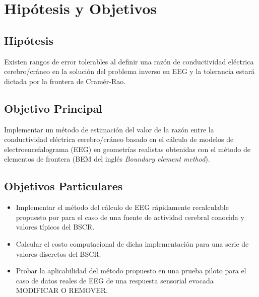 %
\chapter{Hipótesis y Objetivos}
\label{sec:obj}

\section{Hipótesis}
\label{sec:obj:hipotesis}

Existen rangos de error tolerables al definir una razón de conductividad eléctrica cerebro/cráneo en la solución del problema inverso en EEG y la tolerancia estará dictada por la frontera de Cramér-Rao.

\section{Objetivo Principal}
\label{sec:obj:main}

Implementar un método de estimación del valor de la razón entre la conductividad eléctrica cerebro/cráneo basado en el cálculo de modelos de electroencefalograma (EEG) en geometrías realistas obtenidas con el método de elementos de frontera (BEM del inglés \emph{Boundary element method}).

\section{Objetivos Particulares}
\label{sec:obj:individual}

\begin{itemize}
	\item Implementar el método del cálculo de EEG rápidamente recalculable propuesto por \citeauthor{Ermer2001}\cite{Ermer2001} para el caso de una fuente de actividad cerebral conocida y valores típicos del BSCR.
	\item Calcular el costo computacional de dicha implementación para una serie de valores discretos del BSCR.
	\item Probar la aplicabilidad del método propuesto en una prueba piloto para el caso de datos reales de EEG de una respuesta sensorial evocada MODIFICAR O REMOVER.
\end{itemize}